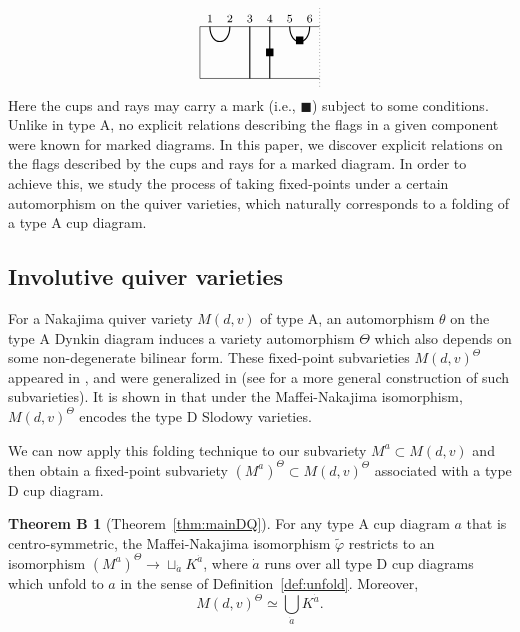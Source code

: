 \documentclass[11pt,reqno]{amsart}
\numberwithin{equation}{section}
\theoremstyle{definition}
\newtheorem*{thmB}{Theorem B}
\newcommand{\da}{\dot{a}}
\newcommand{\tphi}{\widetilde{\varphi}}
\begin{document}
\[\begin{tikzpicture}[baseline={(0,-.3)}]
\draw (5.75,0) -- (2.75,0) -- (2.75,-1.3) -- (5.75,-1.3);
\draw[dotted] (5.75,-1.5) -- (5.75,.5);
\begin{footnotesize}
\node at (3,.2) {$1$};
\node at (5.25, -.35) {$\blacksquare$};
\node at (3.5,.2) {$2$};
\node at (4,.2) {$3$};
\node at (4.5, -.65) {$\blacksquare$};
\node at (4.5,.2) {$4$};
\node at (5,.2) {$5$};
\node at (5.5,.2) {$6$};
\end{footnotesize}
\draw[thick] (4.5,0) -- (4.5, -1.3);
\draw[thick] (4,0) -- (4, -1.3);
\draw[thick] (3,0) .. controls +(0,-.5) and +(0,-.5) .. +(.5,0);
\draw[thick] (5,0) .. controls +(0,-.5) and +(0,-.5) .. +(.5,0);
\end{tikzpicture}
\]
Here the cups and rays may carry a mark (i.e., $\blacksquare$) subject to some conditions.
Unlike in type A, no explicit relations describing the flags in a given component were known for marked diagrams.
In this paper, we discover explicit relations on the flags described by the cups and rays for a marked diagram. 
In order to achieve this, we study the process of taking fixed-points under a certain automorphism on the quiver varieties, which naturally corresponds to a folding of a type A cup diagram.

\subsection{Involutive quiver varieties}
For a Nakajima quiver variety $M(d,v)$ of type A, an automorphism $\theta$ on the type A Dynkin diagram induces a 
variety automorphism $\Theta$ which also depends on some non-degenerate bilinear form.
These fixed-point subvarieties $M(d,v)^\Theta$ appeared in \cite{HL14}, and were generalized in \cite{Li19} (see \cite[Section 4]{Li19} for a more general construction of such subvarieties).
It is shown in \cite{HL14} that under the Maffei-Nakajima isomorphism, $M(d,v)^\Theta$ encodes the type D Slodowy varieties.

We can now apply this folding technique to our subvariety $M^a  \subset  M(d,v)$ and then obtain a fixed-point subvariety $(M^a)^\Theta \subset M(d,v)^\Theta$ associated with a type D cup diagram.

\begin{thmB}[Theorem~\ref{thm:mainDQ}]
For any type A cup diagram $a$ that is centro-symmetric, the Maffei-Nakajima isomorphism $\tphi$ 
restricts to an isomorphism $ (M^a)^\Theta \to \sqcup_{\da} K^{\da}$,
where $\da$ runs over all type D cup diagrams which unfold to $a$ in the sense of Definition~\ref{def:unfold}.
Moreover, 
\[
M(d,v)^\Theta \simeq \bigcup_{\da} K^{\da}.
\]
\end{thmB}
\end{document}
